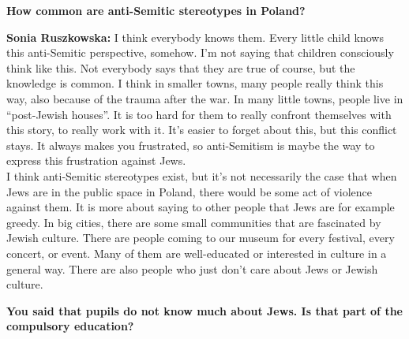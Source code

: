 
\textbf{How common are anti-Semitic stereotypes in Poland?} 

\textbf{Sonia Ruszkowska:} I think everybody knows them. Every little child knows this anti-Semitic perspective, somehow. I’m not saying that children consciously think like this. Not everybody says that they are true of course, but the knowledge is common. I think in smaller towns, many people really think this way, also because of the trauma after the war. In many little towns, people live in ``post-Jewish houses''. It is too hard for them to really confront themselves with this story, to really work with it. It’s easier to forget about this, but this conflict stays. It always makes you frustrated, so anti-Semitism is maybe the way to express this frustration against Jews.\\
I think anti-Semitic stereotypes exist, but it’s not necessarily the case that when Jews are in the public space in Poland, there would be some act of violence against them. It is more about saying to other people that Jews are for example greedy. In big cities, there are some small communities that are fascinated by Jewish culture. There are people coming to our museum for every festival, every concert, or event. Many of them are well-educated or interested in culture in a general way. There are also people who just don’t care about Jews or Jewish culture. 

\textbf{You said that pupils do not know much about Jews. Is that part of the compulsory education?} 

